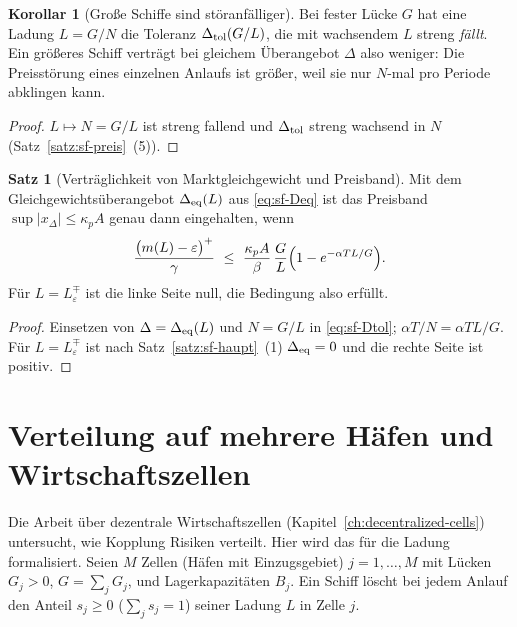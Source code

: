 \documentclass[a4paper, 12pt, twoside, openright]{report}
\providecommand{\pos}[1]{\bigl(#1\bigr)^{+}}   %
\theoremstyle{definition}
\theoremstyle{definition}
\newtheorem{satz}{Satz}[chapter]
\newtheorem{korollar}{Korollar}[chapter]
\begin{document}
\begin{korollar}[Große Schiffe sind störanfälliger]\label{kor:sf-gross}
Bei fester Lücke $G$ hat eine Ladung $L=G/N$ die Toleranz $\Delta_{\rm tol}(G/L)$, die
mit wachsendem $L$ streng \emph{fällt}. Ein größeres Schiff verträgt bei
gleichem Überangebot $\Delta$ also weniger: Die Preisstörung eines einzelnen
Anlaufs ist größer, weil sie nur $N$-mal pro Periode abklingen kann.
\end{korollar}

\begin{proof}
$L\mapsto N=G/L$ ist streng fallend und $\Delta_{\rm tol}$ streng wachsend in $N$
(Satz~\ref{satz:sf-preis}~(5)).
\end{proof}

\begin{satz}[Verträglichkeit von Marktgleichgewicht und Preisband]\label{satz:sf-vertr}
Mit dem Gleichgewichtsüberangebot $\Delta_{\rm eq}(L)$ aus \eqref{eq:sf-Deq} ist
das Preisband $\sup|x_\Delta|\le\kappa_pA$ genau dann eingehalten, wenn
\begin{equation}
  \frac{\pos{m(L)-\varepsilon}}{\gamma}\ \le\ \frac{\kappa_pA}{\beta}\,\frac{G}{L}\Bigl(1-e^{-\alpha TL/G}\Bigr).
  \label{eq:sf-vertr}
\end{equation}
Für $L=L_\varepsilon^\mp$ ist die linke Seite null, die Bedingung also erfüllt.
\end{satz}

\begin{proof}
Einsetzen von $\Delta=\Delta_{\rm eq}(L)$ und $N=G/L$ in \eqref{eq:sf-Dtol};
$\alpha T/N=\alpha TL/G$. Für $L=L_\varepsilon^\mp$ ist nach
Satz~\ref{satz:sf-haupt}~(1) $\Delta_{\rm eq}=0$ und die rechte Seite ist positiv.
\end{proof}

\section{Verteilung auf mehrere Häfen und Wirtschaftszellen}\label{sec:sf-zellen}

Die Arbeit über dezentrale Wirtschaftszellen (Kapitel~\ref{ch:decentralized-cells})
untersucht, wie Kopplung Risiken verteilt. Hier wird das für die Ladung
formalisiert. Seien $M$ Zellen (Häfen mit Einzugsgebiet) $j=1,\dots,M$ mit Lücken
$G_j>0$, $G=\sum_jG_j$, und Lagerkapazitäten $B_j$. Ein Schiff löscht bei jedem
Anlauf den Anteil $s_j\ge0$ ($\sum_js_j=1$) seiner Ladung $L$ in Zelle $j$.
\end{document}
